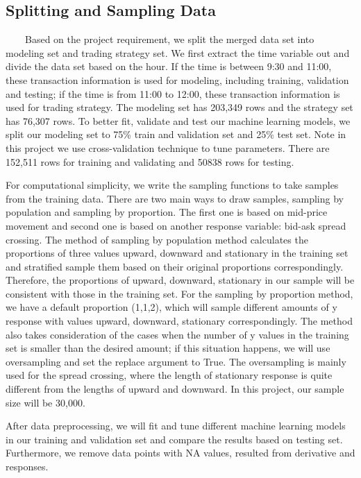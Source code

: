 \documentclass[11pt]{article}
\begin{document}
\subsection{Splitting and Sampling Data}
\ \ \ \ Based on the project requirement, we split the merged data set into modeling set and trading strategy set. We first extract the time variable out and divide the data set based on the hour. If the time is between 9:30 and 11:00, these transaction information is used for modeling, including training, validation and testing; if the time is from 11:00 to 12:00, these transaction information is used for trading strategy. The modeling set has 203,349 rows and the strategy set has 76,307 rows. To better fit, validate and test our machine learning models, we split our modeling set to 75\% train and validation set and 25\% test set. Note in this project we use cross-validation technique to tune parameters. There are 152,511 rows for training and validating and 50838 rows for testing.
\par
For computational simplicity, we write the sampling functions to take samples from the training data. There are two main ways to draw samples, sampling by population and sampling by proportion. The first one is based on mid-price movement and second one is based on another response variable: bid-ask spread crossing. The method of sampling by population method calculates the proportions of three values upward, downward and stationary in the training set and stratified sample them based on their original proportions correspondingly. Therefore, the proportions of upward, downward, stationary in our sample will be consistent with those in the training set. For the sampling by proportion method, we have a default proportion (1,1,2), which will sample different amounts of y response with values upward, downward, stationary correspondingly. The method also takes consideration of the cases when the number of y values in the training set is smaller than the desired amount; if this situation happens, we will use oversampling and set the replace argument to True. The oversampling is mainly used for the spread crossing, where the length of stationary response is quite different from the lengths of upward and downward. In this project, our sample size will be 30,000. 
\par 
After data preprocessing, we will fit and tune different machine learning models in our training and validation set and compare the results based on testing set. Furthermore, we remove data points with NA values, resulted from derivative and responses. 
\end{document}
